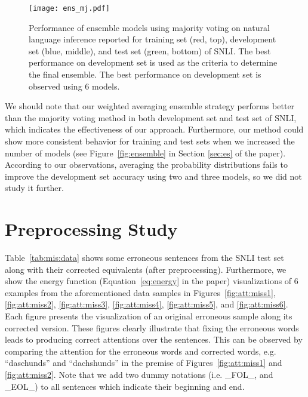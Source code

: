 \documentclass[11pt,a4paper]{article}
\begin{document}
	\begin{figure}[t]
		\centering
		\texttt{[image: ens\_mj.pdf]}
		\caption{Performance of  ensemble models using majority voting on natural language inference reported for training set (red, top), development set (blue, middle), and test set (green, bottom) of SNLI. The best performance on development set is used as the criteria to determine the final ensemble. The best performance on development set is observed using 6 models. \label{fig:mj:ensemble}}
	\end{figure}
	
	We should note that our weighted averaging ensemble strategy performs better than the majority voting method in both development set and test set of SNLI, which indicates the effectiveness of our approach. Furthermore, our method could show more consistent behavior for training and test sets when we increased the number of models (see Figure~\ref{fig:ensemble} in Section \ref{sec:es} of the paper). According to our observations, averaging the probability distributions fails to improve the development set accuracy using two and three models, so we did not study it further.
	
	\section{Preprocessing Study}
	\label{app:preproc:sec}
	
	\noindent Table~\ref{tab:mis:data} shows some erroneous sentences from the SNLI test set along with their corrected equivalents (after preprocessing). Furthermore, we show the energy function (Equation~\ref{eq:energy} in the paper) visualizations of 6 examples from the aforementioned data samples in Figures~\ref{fig:att:miss1}, \ref{fig:att:miss2}, \ref{fig:att:miss3}, \ref{fig:att:miss4}, \ref{fig:att:miss5}, and \ref{fig:att:miss6}. Each figure presents the visualization of an original erroneous sample along its corrected version. These figures clearly illustrate that fixing the erroneous words leads to producing correct attentions over the sentences. This can be observed by comparing the attention for the erroneous words and corrected words, e.g. ``daschunds'' and ``dachshunds'' in the premise of Figures~\ref{fig:att:miss1} and \ref{fig:att:miss2}. Note that we add two dummy notations (i.e. \_FOL\_, and \_EOL\_) to all sentences which indicate their beginning and end. 
	

	
	\begin{figure*}[ht]
		\begin{center}
\end{center}
		\caption{
			Visualization of the energy function for one erroneous sample (a) and the fixed sample (b). The gold label is \emph{Entailment}. Our model returns \emph{Contradiction} for the erroneous sample, but correctly classifies the fixed sample.
		}
		\label{fig:att:miss1}
	\end{figure*}
	
\end{document}
